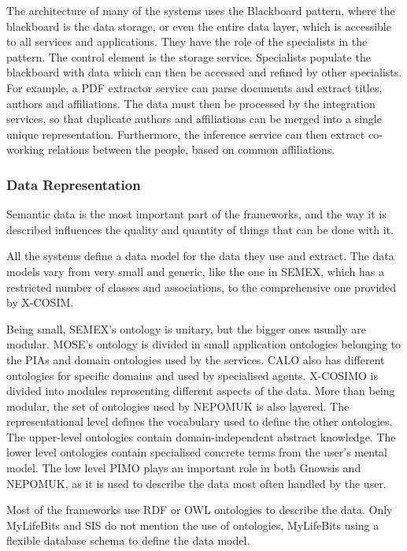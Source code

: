 The architecture of many of the systems uses the Blackboard pattern, where the blackboard is the data storage, or even the entire data layer, which is accessible to all services and applications. They have the role of the specialists in the pattern. The control element is the storage service. Specialists populate the blackboard with data which can then be accessed and refined by other specialists. For example, a PDF extractor service can parse documents and extract titles, authors and affiliations. The data must then be processed by the integration services, so that duplicate authors and affiliations can be merged into a single unique representation. Furthermore, the inference service can then extract co-working relations between the people, based on common affiliations.

\subsubsection{Data Representation}
\label{sub:vocabs}

Semantic data is the most important part of the frameworks, and the way it is described influences the quality and quantity of things that can be done with it.

All the systems define a data model for the data they use and extract. The data models vary from very small and generic, like the one in SEMEX, which has a restricted number of classes and associations, to the comprehensive one provided by X-COSIM.

Being small, SEMEX's ontology is unitary, but the bigger ones usually are modular. MOSE's ontology is divided in small application ontologies belonging to the PIAs and domain ontologies used by the services. CALO also has different ontologies for specific domains and used by specialised agents. X-COSIMO is divided into modules representing different aspects of the data.
More than being modular, the set of ontologies used by NEPOMUK is also layered. The representational level defines the vocabulary used to define the other ontologies. The upper-level ontologies contain domain-independent abstract knowledge. The lower level ontologies contain specialised concrete terms from the user's mental model. The low level PIMO plays an important role in both Gnowsis and NEPOMUK, as it is used to describe the data most often handled by the user.

Most of the frameworks use RDF or OWL ontologies to describe the data.
Only MyLifeBits and SIS do not mention the use of ontologies, MyLifeBits using a flexible database schema to define the data model. 


